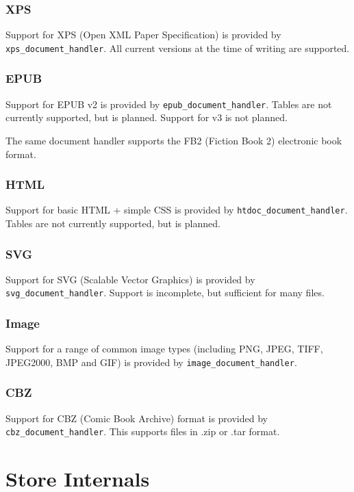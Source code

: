 \documentclass[oneside]{book}
\begin{document}
\subsection{XPS}

Support for XPS (Open XML Paper Specification) is provided by \texttt{xps\_document\_handler}. All current versions at the time of writing are supported.

\subsection{EPUB}

Support for EPUB v2 is provided by \texttt{epub\_document\_handler}. Tables are not currently supported, but is planned. Support for v3 is not planned.

The same document handler supports the FB2 (Fiction Book 2) electronic book format.

\subsection{HTML}

Support for basic HTML + simple CSS is provided by \texttt{htdoc\_document\_handler}. Tables are not currently supported, but is planned.

\subsection{SVG}

Support for SVG (Scalable Vector Graphics) is provided by \texttt{svg\_document\_handler}. Support is incomplete, but sufficient for many files.

\subsection{Image}

Support for a range of common image types (including PNG, JPEG, TIFF, JPEG2000, BMP and GIF) is provided by \texttt{image\_document\_handler}.

\subsection{CBZ}

Support for CBZ (Comic Book Archive) format is provided by \texttt{cbz\_document\_handler}. This supports files in .zip or .tar format.

\chapter{Store Internals}
\label{StoreInternals}
\end{document}
